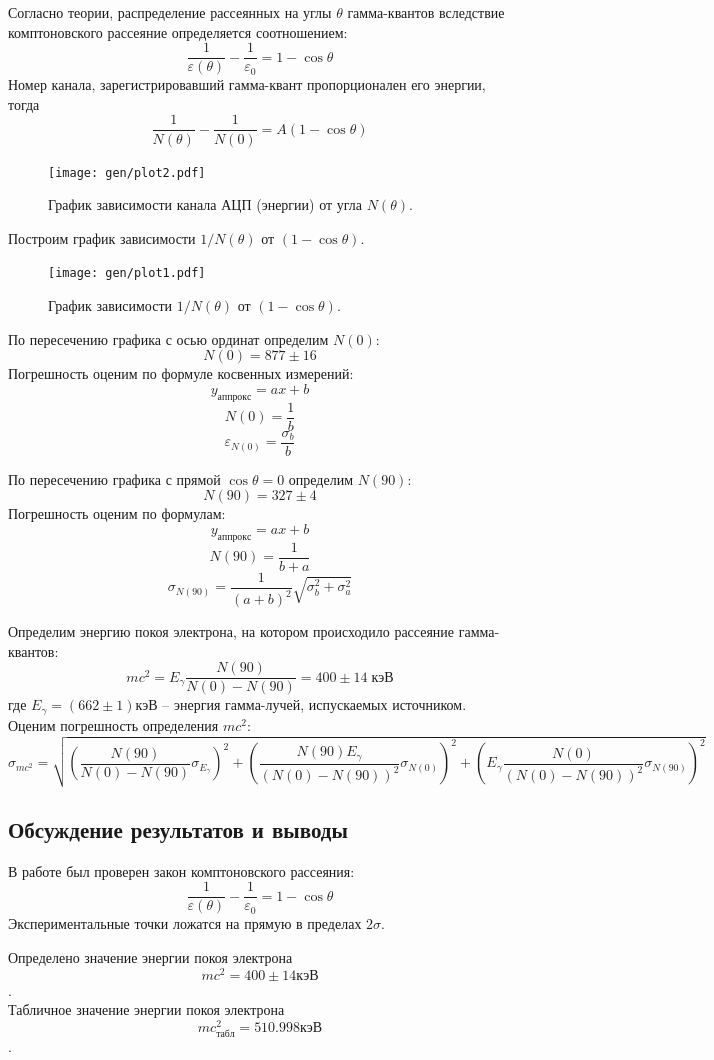 \documentclass[10pt,a4paper]{article}
\begin{document}
	Согласно теории, распределение рассеянных на углы $\theta$ гамма-квантов вследствие комптоновского рассеяние определяется соотношением: 
	$$
	\frac{1}{\varepsilon(\theta)} - \frac{1}{\varepsilon_0} = 1 - \cos \theta
	$$
	Номер канала, зарегистрировавший гамма-квант пропорционален его энергии, тогда
	$$
	\frac{1}{N(\theta)} - \frac{1}{N(0)} = A (1 - \cos \theta)
	$$
	
	\begin{figure}
		\centering
		\texttt{[image: gen/plot2.pdf]}
		\caption{График зависимости канала АЦП (энергии) от угла $N(\theta)$.}
	\end{figure}
	
	
	Построим график зависимости $1/N(\theta)$ от $(1 - \cos \theta)$.\\
	\begin{figure}
		\centering
		\texttt{[image: gen/plot1.pdf]}
		\caption{График зависимости $1/N(\theta)$ от $(1 - \cos \theta)$.}
	\end{figure}

	По пересечению графика с осью ординат определим $N(0)$:
	$$N(0) = 877 \pm 16$$
	Погрешность оценим по формуле косвенных измерений: 
	$$y_{аппрокс} = ax + b$$
	$$N(0) = \frac{1}{b}$$
	$$\varepsilon_{N(0)} = \frac{\sigma_b}{b}$$
	
	По пересечению графика с прямой $\cos \theta = 0$ определим $N(90)$:
	$$N(90) = 327 \pm 4$$
	Погрешность оценим по формулам: 
	$$y_{аппрокс} = ax + b$$
	$$N(90) = \frac{1}{b + a}$$ 
	$$\sigma_{N(90)} = \frac{1}{(a + b)^2}\sqrt{\sigma_b^2 + \sigma_a^2}$$
	
	Определим энергию покоя электрона, на котором происходило рассеяние гамма-квантов: \\
	$$
	mc^2 = E_\gamma \frac{N(90)}{N(0) - N(90)} = 400 \pm 14 \; кэВ
	$$
	где $E_\gamma = (662\pm1) кэВ$ -- энергия гамма-лучей, испускаемых источником. Оценим погрешность определения $mc^2$:\\
	$$\sigma_{mc^2} = \sqrt{(\frac{N(90)}{N(0) - N(90)} \sigma_{E_\gamma})^2 + (\frac{N(90) E_\gamma}{(N(0) - N(90))^2} \sigma_{N(0)})^2 + (E_\gamma \frac{N(0)}{(N(0) - N(90))^2}\sigma_{N(90)})^2}$$
	
	\subsection*{Обсуждение результатов и выводы}
	
	В работе был проверен закон комптоновского рассеяния:
	$$
	\frac{1}{\varepsilon(\theta)} - \frac{1}{\varepsilon_0} = 1 - \cos \theta
	$$
	Экспериментальные точки ложатся на прямую в пределах $2\sigma$.
	
	Определено значение энергии покоя электрона $$mc^2 = 400 \pm 14 кэВ$$. \\
	Табличное значение энергии покоя электрона $$mc^2_{табл} = 510.998 кэВ$$.
	
\end{document}

